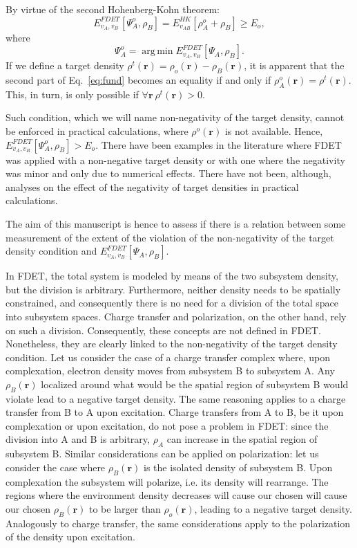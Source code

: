 \documentclass[journal=jctcce,manuscript=article, layout=twocolumn]{achemso}
\DeclareMathOperator*{\argmin}{arg\,min}
\begin{document}
By virtue of the second Hohenberg-Kohn theorem:
\begin{equation}\label{eq:fund}
 E_{v_A,v_B}^{FDET}[\Psi_{A}^{o},\rho_B] =  E_{v_{AB}}^{HK}[\rho_A^{o}+\rho_B] \ge E_o,
\end{equation}
where
\begin{equation} \label{eq:Psi_o}
 \Psi_{A}^{o} = \argmin E_{v_A,v_B}^{FDET}[\Psi_{A},\rho_B].
\end{equation}
If we define a target density $\rho^t(\mathbf{r}) = \rho_o(\mathbf{r}) - \rho_B(\mathbf{r})$, it is apparent that the second part of Eq.~\ref{eq:fund} becomes an equality if and only if $\rho_A^{o}(\mathbf{r}) = \rho^t(\mathbf{r})$. This, in turn, is only possible if $\forall \mathbf{r} \ \rho^t(\mathbf{r}) > 0$. 

Such condition, which we will name non-negativity of the target density, cannot be enforced in practical calculations, where $\rho^o(\mathbf{r})$ is not available. Hence, $E_{v_A,v_B}^{FDET}[\Psi_{A}^{o},\rho_B] > E_o$. There have been examples in the literature where FDET was applied with a non-negative target density\cite{Wesolowski2013} or with one where the negativity was minor and only due to numerical effects\cite{Fux2010}. There have not been, although, analyses on the effect of the negativity of target densities in practical calculations.

The aim of this manuscript is hence to assess if there is a relation between some measurement of the extent of the violation of the non-negativity of the target density condition and ${E}_{v_A,v_B}^{FDET}[\Psi_{A},\rho_B]$.

In FDET, the total system is modeled by means of the two subsystem density, but the division is arbitrary. Furthermore, neither density needs to be spatially constrained, and consequently there is no need for a division of the total space into subsystem spaces. Charge transfer and polarization, on the other hand, rely on such a division. Consequently, these concepts are not defined in FDET. Nonetheless, they are clearly linked to the non-negativity of the target density condition.
Let us consider the case of a charge transfer complex where, upon complexation, electron density moves from subsystem B to subsystem A. Any $\rho_B(\mathbf{r})$ localized around what would be the spatial region of subsystem B would violate lead to a negative target density. The same reasoning applies to a charge transfer from B to A upon excitation.
Charge transfers from A to B, be it upon complexation or upon excitation, do not pose a problem in FDET: since the division into A and B is arbitrary, $\rho_A$ can increase in the spatial region of subsystem B.
Similar considerations can be applied on polarization: let us consider the case where $\rho_B(\mathbf{r})$ is the isolated density of subsystem B. Upon complexation the subsystem will polarize, i.e. its density will rearrange. The regions where the environment density decreases will cause our chosen will cause our chosen $\rho_B(\mathbf{r})$ to be larger than $\rho_o(\mathbf{r})$, leading to a negative target density. Analogously to charge transfer, the same considerations apply to the polarization of the density upon excitation.
\end{document}
